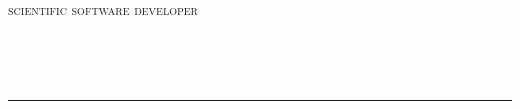 \thispagestyle{frontpage}
\begin{minipage}[b]{0.7\textwidth}
   \begin{flushleft}
       \fontsize{24}{20} \selectfont \textsc{\myname{}} \\
       \fontsize{12}{14} \textsc{scientific software developer}
   \end{flushleft}
\end{minipage}
\begin{minipage}[b]{0.3\textwidth}
   \begin{flushright}
       \myemail{} \\ \myphone{}
   \end{flushright}
\end{minipage}\\
\textcolor{gray}{\rule{\textwidth}{0.1mm}}
